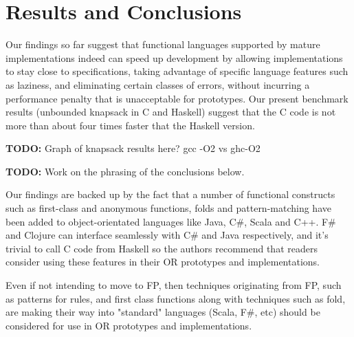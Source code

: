 \section{Results and Conclusions}

Our findings so far suggest that functional languages supported by mature
implementations indeed can speed up development by allowing implementations to
stay close to specifications, taking advantage of specific language features
such as laziness, and eliminating certain classes of errors, without incurring
a performance penalty that is unacceptable for prototypes. Our present
benchmark results (unbounded knapsack in C and Haskell) suggest that the C
code is not more than about four times faster that the Haskell version.

\textbf{TODO:} Graph of knapsack results here? gcc -O2 vs ghc-O2

\textbf{TODO:} Work on the phrasing of the conclusions below.

Our findings are backed up by the fact that a number of functional constructs such as first-class and anonymous functions, folds and pattern-matching have been added to object-orientated  languages like Java, C\#, Scala and C++. F\# and Clojure can interface seamlessly with C\# and Java respectively, and it's trivial to call C code from Haskell\cite{ffi} so the authors recommend that readers consider using these features in their OR prototypes and implementations.


Even if not intending to move to FP, then techniques originating from 
FP, such as patterns for rules, and first class functions  along with 
techniques such as fold, are making their way into "standard" languages 
(Scala, F\#, etc) should be considered for use in OR prototypes and 
implementations.
